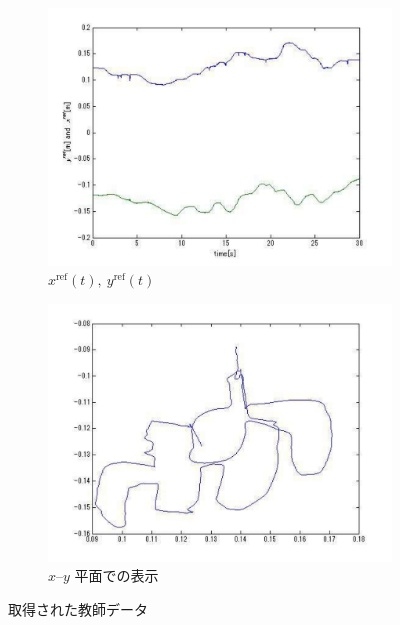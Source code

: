 \begin{figure}[H]
    \centering
    \begin{subfigure}[b]{0.45\linewidth}
        \centering
        \includegraphics[width=\linewidth]{figure/fig1_xref_yref.pdf}
        \caption{$x^{\mathrm{ref}}(t),\ y^{\mathrm{ref}}(t)$}
    \end{subfigure}
    \begin{subfigure}[b]{0.45\linewidth}
        \centering
        \includegraphics[width=\linewidth]{figure/dairekuto1.pdf}
        \caption{$x$--$y$ 平面での表示}
    \end{subfigure}
    \caption{取得された教師データ}
    \label{fig:teaching_data}
\end{figure}


